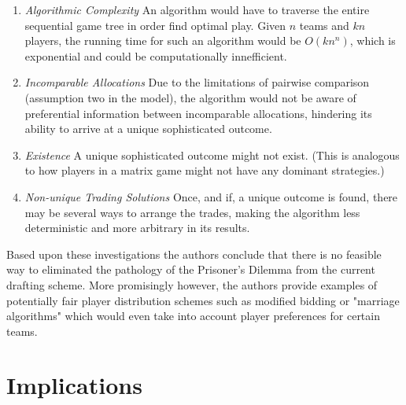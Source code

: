 \documentclass{article}
\begin{document}
\begin{enumerate}

	\item{\em Algorithmic Complexity} An algorithm would have to traverse the entire sequential game tree in order find optimal play. Given $n$ teams and $kn$ players, the running time for such an algorithm would be $O(kn^{n})$, which is exponential and could be computationally innefficient.

	\item{\em Incomparable Allocations} Due to the limitations of pairwise comparison (assumption two in the model), the algorithm would not be aware of preferential information between incomparable allocations, hindering its ability to arrive at a unique sophisticated outcome.

	\item{\em Existence} A unique sophisticated outcome might not exist. (This is analogous to how players in a matrix game might not have any dominant strategies.)

	\item{\em Non-unique Trading Solutions} Once, and if, a unique outcome is found, there may be several ways to arrange the trades, making the algorithm less deterministic and more arbitrary in its results.

\end{enumerate}

Based upon these investigations the authors conclude that there is no feasible way to eliminated the pathology of the Prisoner's Dilemma from the current drafting scheme. More promisingly however, the authors provide examples of potentially fair player distribution schemes such as modified bidding or "marriage algorithms" which would even take into account player preferences for certain teams. 

\section{Implications}
\end{document}
